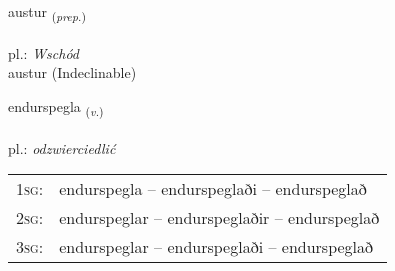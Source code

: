\documentclass[frontgrid, backgrid]{flacards}\usepackage[]{graphicx}\usepackage[]{xcolor}
\begin{document}

\renewcommand{\flhead}{\vskip5pt \fboxsep=0pt {\small\bfseries\footnotesize Forsetning | Preposition}}
\renewcommand{\fcfoot}{\vskip5pt \fboxsep=0pt \hspace{2pt}{\small\bfseries\footnotesize 2K}}

\renewcommand{\blhead}{\vskip5pt {\small\bfseries\footnotesize Forsetning | Preposition }}
\renewcommand{\bcfoot}{\vskip5pt \hspace{2pt}{\small\bfseries\footnotesize 2K}}


{austur \small{\textsubscript{(\textit{prep.})}} \\[1ex]
\textphonetic{[œistʏr]} \\
pl.: \emph{Wschód} \\  [2ex]
austur (Indeclinable)}

\renewcommand{\flhead}{\vskip5pt \fboxsep=0pt {\small\bfseries\footnotesize Sagnorð | Verb}}
\renewcommand{\fcfoot}{\vskip5pt \fboxsep=0pt \hspace{2pt}{\small\bfseries\footnotesize 2K}}

\renewcommand{\blhead}{\vskip5pt {\small\bfseries\footnotesize Sagnorð | Verb }}
\renewcommand{\bcfoot}{\vskip5pt \hspace{2pt}{\small\bfseries\footnotesize 2K}}


{endurspegla \small{\textsubscript{(\textit{v.})}} \\[1ex] %
 \\
pl.: \emph{odzwierciedlić} \\  [2ex]
\renewcommand*{\arraystretch}{0.8}
\begin{tabular}{p{1cm}l}
\textsc{1sg}: & endurspegla -- endurspeglaði -- endurspeglað \\ 
\textsc{2sg}: & endurspeglar -- endurspeglaðir -- endurspeglað \\ 
\textsc{3sg}: & endurspeglar -- endurspeglaði -- endurspeglað \\ 
\end{tabular}
}
\end{document}
